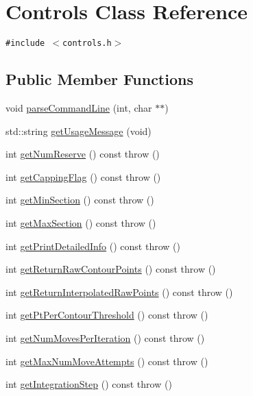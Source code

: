\hypertarget{classControls}{
\section{Controls Class Reference}
\label{classControls}
}
{\tt \#include $<$controls.h$>$}

\subsection*{Public Member Functions}
\begin{CompactItemize}
\item 
void \hyperlink{classControls_c155d57ffffad8062dca68e5dd8e45c1}{parseCommandLine} (int, char $\ast$$\ast$)
\item 
std::string \hyperlink{classControls_cc10201b6a7efde6066fd29e797abaf4}{getUsageMessage} (void)
\item 
int \hyperlink{classControls_b7738197e6e7658acde1e73bf6519c41}{getNumReserve} () const   throw ()
\item 
int \hyperlink{classControls_718c293ec502518db33c8491e8ef84db}{getCappingFlag} () const   throw ()
\item 
int \hyperlink{classControls_5f70bbd62a41dd74fee9750acf432a19}{getMinSection} () const   throw ()
\item 
int \hyperlink{classControls_afc35dff6349419fe3b0089c78a56127}{getMaxSection} () const   throw ()
\item 
int \hyperlink{classControls_fb69cf3fe723123d382dbf709ece5f84}{getPrintDetailedInfo} () const   throw ()
\item 
int \hyperlink{classControls_7d717253ec34914ab2643b463777f72d}{getReturnRawContourPoints} () const   throw ()
\item 
int \hyperlink{classControls_96dac19dcb0a887e9e3f49c663bb5709}{getReturnInterpolatedRawPoints} () const   throw ()
\item 
int \hyperlink{classControls_4ba998e75d7c20623b65863de139aecf}{getPtPerContourThreshold} () const   throw ()
\item 
int \hyperlink{classControls_a3748a625808c17247692cd9c8d5ca4c}{getNumMovesPerIteration} () const   throw ()
\item 
int \hyperlink{classControls_c1bb853f9584201b07822e6c44e73f1a}{getMaxNumMoveAttempts} () const   throw ()
\item 
int \hyperlink{classControls_68df257c4251022461ab172c787d5242}{getIntegrationStep} () const   throw ()
\item 
$$
\end{CompactItemize}
